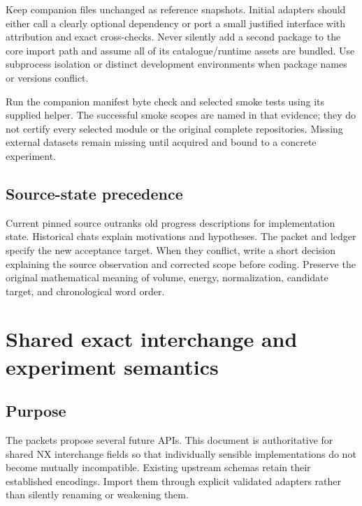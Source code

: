\documentclass[
  11pt,
  a4paper,
]{report}
\let\nxtexttt\texttt
\renewcommand{\texttt}[1]{\nxtexttt{\seqsplit{#1}}}
\begin{document}
Keep companion files unchanged as reference snapshots. Initial adapters
should either call a clearly optional dependency or port a small
justified interface with attribution and exact cross-checks. Never
silently add a second \texttt{perfectpower} package to the core import
path and assume all of its catalogue/runtime assets are bundled. Use
subprocess isolation or distinct development environments when package
names or versions conflict.

Run the companion manifest byte check and selected smoke tests using its
supplied helper. The successful smoke scopes are named in that evidence;
they do not certify every selected module or the original complete
repositories. Missing external datasets remain missing until acquired
and bound to a concrete experiment.

\hypertarget{source-state-precedence}{%
\section{Source-state precedence}\label{source-state-precedence}}

Current pinned source outranks old progress descriptions for
implementation state. Historical chats explain motivations and
hypotheses. The packet and ledger specify the new acceptance target.
When they conflict, write a short decision explaining the source
observation and corrected scope before coding. Preserve the original
mathematical meaning of volume, energy, normalization, candidate target,
and chronological word order.

\hypertarget{shared-exact-interchange-and-experiment-semantics}{%
\chapter{Shared exact interchange and experiment
semantics}\label{shared-exact-interchange-and-experiment-semantics}}

\hypertarget{purpose}{%
\section{Purpose}\label{purpose}}

The packets propose several future APIs. This document is authoritative
for shared NX interchange fields so that individually sensible
implementations do not become mutually incompatible. Existing upstream
schemas retain their established encodings. Import them through explicit
validated adapters rather than silently renaming or weakening them.
\end{document}
